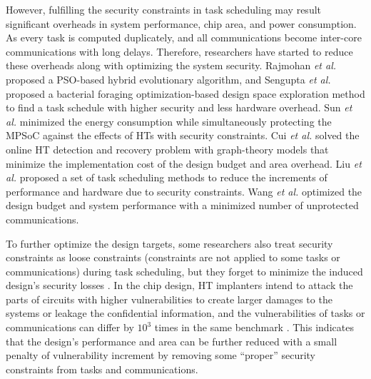 \documentclass[10pt,journal, compsoc]{IEEEtran}
\begin{document}
However, fulfilling the security constraints in task scheduling may result significant overheads in system performance, chip area, and power consumption. As every task is computed duplicately, and all communications become inter-core communications with long delays. Therefore, researchers have started to reduce these overheads along with optimizing the system security. Rajmohan \textit{et al.} \cite{article:SR} proposed a PSO-based hybrid evolutionary algorithm, and Sengupta \textit{et al.} \cite{conference:AS} proposed a bacterial foraging optimization-based design space exploration method to find a task schedule with higher security and less hardware overhead. Sun \textit{et al.} \cite{article:YS} minimized the energy consumption while simultaneously protecting the MPSoC against the effects of HTs with security constraints. Cui \textit{et al.} \cite{article:XC} solved the online HT detection and recovery problem with graph-theory models that minimize the implementation cost of the design budget and area overhead. Liu \textit{et al.}\cite{article:CL} proposed a set of task scheduling methods to reduce the increments of performance and hardware due to security constraints. Wang \textit{et al.} \cite{article:NW, conference:NW} optimized the design budget and system performance with a minimized number of unprotected communications.






To further optimize the design targets, some researchers also treat security constraints as loose constraints (constraints are not applied to some tasks or communications) during task scheduling, but they forget to minimize the induced design's security losses \cite{article:CL, article:NW, conference:NW}. In the chip design, HT implanters intend to attack the parts of circuits with higher vulnerabilities to create larger damages to the systems or leakage the confidential information, and the vulnerabilities of tasks or communications can differ by $10^3$ times in the same benchmark \cite{conference:HS}. This indicates that the design's performance and area can be further reduced with a small penalty of vulnerability increment by removing some ``proper'' security constraints from tasks and communications.%
\end{document}
